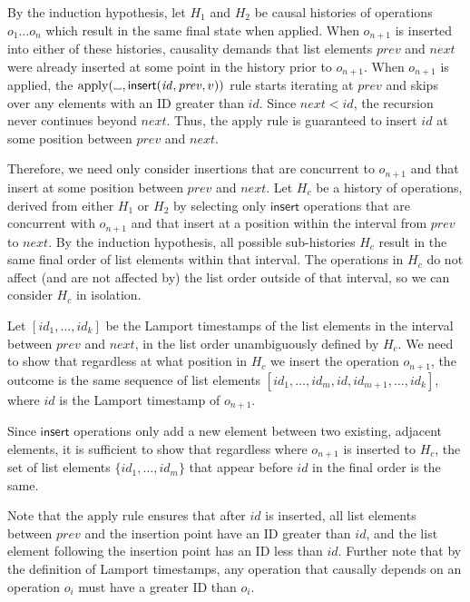 \documentclass[a4paper,twocolumn,10pt]{article}
\newcommand{\placeholder}{%
  \makebox[0.7em]{%
    \kern.07em
    \vrule height.3ex
    \hrulefill
    \vrule height.3ex
    \kern.07em
  }%
}
\begin{document}
By the induction hypothesis, let $H_1$ and $H_2$ be causal histories of operations $o_1 \dots o_n$ which result in the same final state when applied. When $o_{n+1}$ is inserted into either of these histories, causality demands that list elements $\mathit{prev}$ and $\mathit{next}$ were already inserted at some point in the history prior to $o_{n+1}$. When $o_{n+1}$ is applied, the $\mathrm{apply}(\placeholder, \mathsf{insert}(\mathit{id}, \mathit{prev}, v))$ rule starts iterating at $\mathit{prev}$ and skips over any elements with an ID greater than $\mathit{id}$. Since $\mathit{next} < \mathit{id}$, the recursion never continues beyond $\mathit{next}$. Thus, the $\mathrm{apply}$ rule is guaranteed to insert $\mathit{id}$ at some position between $\mathit{prev}$ and $\mathit{next}$.

Therefore, we need only consider insertions that are concurrent to $o_{n+1}$ and that insert at some position between $\mathit{prev}$ and $\mathit{next}$. Let $H_c$ be a history of operations, derived from either $H_1$ or $H_2$ by selecting only $\mathsf{insert}$ operations that are concurrent with $o_{n+1}$ and that insert at a position within the interval from $\mathit{prev}$ to $\mathit{next}$. By the induction hypothesis, all possible sub-histories $H_c$ result in the same final order of list elements within that interval. The operations in $H_c$ do not affect (and are not affected by) the list order outside of that interval, so we can consider $H_c$ in isolation.

Let $[\mathit{id}_1, \dots, \mathit{id}_k]$ be the Lamport timestamps of the list elements in the interval between $\mathit{prev}$ and $\mathit{next}$, in the list order unambiguously defined by $H_c$. We need to show that regardless at what position in $H_c$ we insert the operation $o_{n+1}$, the outcome is the same sequence of list elements $[\mathit{id}_1, \dots, \mathit{id}_m, \mathit{id}, \mathit{id}_{m+1}, \dots, \mathit{id}_k]$, where $\mathit{id}$ is the Lamport timestamp of $o_{n+1}$.

Since $\mathsf{insert}$ operations only add a new element between two existing, adjacent elements, it is sufficient to show that regardless where $o_{n+1}$ is inserted to $H_c$, the set of list elements $\{\mathit{id}_1, \dots, \mathit{id}_m\}$ that appear before $\mathit{id}$ in the final order is the same.

Note that the $\mathrm{apply}$ rule ensures that after $\mathit{id}$ is inserted, all list elements between $\mathit{prev}$ and the insertion point have an ID greater than $\mathit{id}$, and the list element following the insertion point has an ID less than $\mathit{id}$. Further note that by the definition of Lamport timestamps, any operation that causally depends on an operation $o_i$ must have a greater ID than $o_i$.
\end{document}
